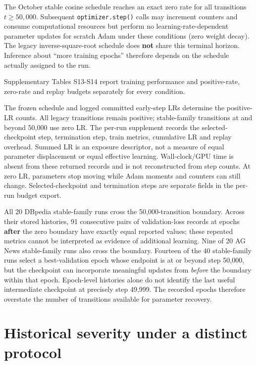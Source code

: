 \documentclass[referee,pdflatex,sn-mathphys-num]{sn-jnl}
\begin{document}
The October stable cosine schedule reaches an exact zero rate for all transitions \(t\ge50{,}000\). Subsequent \texttt{optimizer.step()} calls may increment counters and consume computational resources but perform no learning-rate-dependent parameter updates for scratch Adam under these conditions (zero weight decay). The legacy inverse-square-root schedule does \textbf{not} share this terminal horizon. Inference about ``more training epochs'' therefore depends on the schedule actually assigned to the run.

Supplementary Tables S13-S14 report training performance and positive-rate, zero-rate and replay budgets separately for every condition.

The frozen schedule and logged committed early-step LRs determine the positive-LR counts. All legacy transitions remain positive; stable-family transitions at and beyond 50,000 use zero LR. The per-run supplement records the selected-checkpoint step, termination step, train metrics, cumulative LR and replay overhead. Summed LR is an exposure descriptor, not a measure of equal parameter displacement or equal effective learning. Wall-clock/GPU time is absent from these returned records and is not reconstructed from step counts. At zero LR, parameters stop moving while Adam moments and counters can still change. Selected-checkpoint and termination steps are separate fields in the per-run budget export.

All 20 DBpedia stable-family runs cross the 50,000-transition boundary. Across their stored histories, 91 consecutive pairs of validation-loss records at epochs \textbf{after} the zero boundary have exactly equal reported values; these repeated metrics cannot be interpreted as evidence of additional learning. Nine of 20 AG News stable-family runs also cross the boundary. Fourteen of the 40 stable-family runs select a best-validation epoch whose endpoint is at or beyond step 50,000, but the checkpoint can incorporate meaningful updates from \emph{before} the boundary within that epoch. Epoch-level histories alone do not identify the last useful intermediate checkpoint at precisely step 49,999. The recorded epochs therefore overstate the number of transitions available for parameter recovery.

\section{Historical severity under a distinct protocol}\label{historical-severity-under-a-distinct-protocol}
\end{document}

